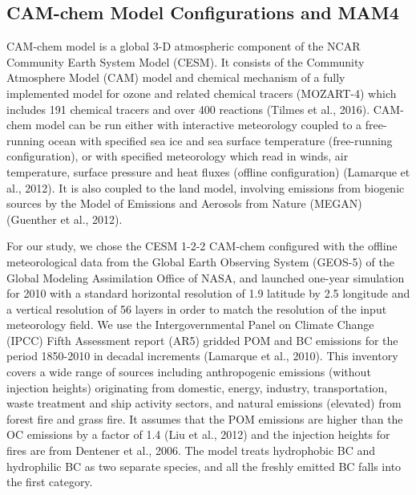 \documentclass[12pt]{article}
\begin{document}
		\subsection{CAM-chem Model Configurations and MAM4}
		
		CAM-chem model is a global 3-D atmospheric component of the NCAR Community Earth System Model (CESM). It consists of the Community Atmosphere Model (CAM) model and chemical mechanism of a fully implemented model for ozone and related chemical tracers (MOZART-4) which includes 191 chemical tracers and over 400 reactions (Tilmes et al., 2016). CAM-chem model can be run either with interactive meteorology coupled to a free-running ocean with specified sea ice and sea surface temperature (free-running configuration), or with specified meteorology which read in winds, air temperature, surface pressure and heat fluxes (offline configuration) (Lamarque et al., 2012). It is also coupled to the land model, involving emissions from biogenic sources by the Model of Emissions and Aerosols from Nature (MEGAN) (Guenther et al., 2012). 

		For our study, we chose the CESM 1-2-2 CAM-chem configured with the offline meteorological data from the Global Earth Observing System (GEOS-5) of the Global Modeling Assimilation Office of NASA, and launched one-year simulation for 2010 with a standard horizontal resolution of 1.9  latitude by 2.5 longitude and a vertical resolution of 56 layers in order to match the resolution of the input meteorology field. We use the Intergovernmental Panel on Climate Change (IPCC) Fifth Assessment report (AR5) gridded POM and BC emissions for the period 1850-2010 in decadal increments (Lamarque et al., 2010). This inventory covers a wide range of sources including anthropogenic emissions (without injection heights) originating from domestic, energy, industry, transportation, waste treatment and ship activity sectors, and natural emissions (elevated) from forest fire and grass fire. It assumes that the POM emissions are higher than the OC emissions by a factor of 1.4 (Liu et al., 2012) and the injection heights for fires are from Dentener et al., 2006. The model treats hydrophobic BC and hydrophilic BC as two separate species, and all the freshly emitted BC falls into the first category. 
\end{document}
